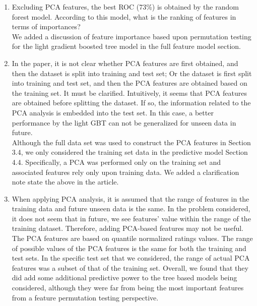 \documentclass{amsart}[12pt]
\begin{document}
\begin{enumerate}
    \item   {\color{blue} 
        Excluding PCA features, the best ROC (73\%) is obtained by the random forest model. According to this model, what is the ranking of features in terms of importances?
        }\\

        We added a discussion of feature importance based upon permutation testing for the light gradient 
        boosted tree model in the full feature model section. 

        \hspace{10pt}
    \item   {\color{blue} 
        In the paper, it is not clear whether PCA features are first obtained, and then the dataset is split into training and test set; Or the dataset is first split into training and test set, and then the PCA features are obtained based on the training set. It must be clarified. Intuitively, it seems that PCA features are obtained before splitting the dataset. If so, the information related to the PCA analysis is embedded into the test set. In this case, a better performance by the light GBT can not be generalized for unseen data in future.
        }\\

        Although the full data set was used to construct the PCA features in Section 3.4, we only 
        considered the training set data in the predictive model Section 4.4.  Specifically, 
        a PCA was performed only on the training set and associated features rely only 
        upon training data.  We added a clarification note state the above in the article.

        \hspace{10pt}
    \item   {\color{blue} 
        When applying PCA analysis, it is assumed that the range of features in the training data and future unseen data is the same. In the problem considered, it does not seem that in future, we see features' value within the range of the training dataset. Therefore, adding PCA-based features may not be useful. 
        }\\

    The PCA features are based on quantile normalized ratings values.  The range of possible values of the 
        PCA features is the same for both the training and test sets.  In the specific test set that 
        we considered, the range of actual PCA features was a subset of that of the training set.  
        Overall, we found that they did add some additional predictive power to the tree based 
        models being considered, although they were far from being the most important features 
        from a feature permutation testing perspective. 


\end{enumerate}
\end{document}
